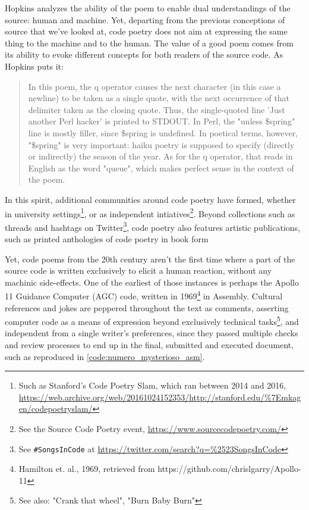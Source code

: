 Hopkins analyzes the ability of the poem to enable dual understandings of the source: human and machine. Yet, departing from the previous conceptions of source that we've looked at, code poetry does not aim at expressing the same thing to the machine and to the human. The value of a good poem comes from its ability to evoke different concepts for both readers of the source code. As Hopkins puts it:

\begin{quote}
  In this poem, the q operator causes the next character (in this case a newline) to be taken as a single quote, with
  the next occurrence of that delimiter taken as the closing quote. Thus, the single-quoted line 'Just another Perl
  hacker' is printed to STDOUT. In Perl, the "unless \$spring" line is mostly filler, since \$spring is undefined. In
  poetical terms, however, "\$spring" is very important: haiku poetry is supposed to specify (directly or indirectly) the
  season of the year. As for the q operator, that reads in English as the word "queue", which makes perfect sense in
  the context of the poem.  \cite{hopkins_camels_1992}
\end{quote}

In this spirit, additional communities around code poetry have formed, whether in university settings\footnote{Such as Stanford's Code Poetry Slam, which ran between 2014 and 2016, \url{https://web.archive.org/web/20161024152353/http://stanford.edu/\%7Emkagen/codepoetryslam/} }, or as independent intiatives\footnote{See the Source Code Poetry event, \url{https://www.sourcecodepoetry.com/}}. Beyond collections such as threads and hashtags on Twitter\footnote{See \lstinline{#SongsInCode} at \url{https://twitter.com/search?q=\%2523SongsInCode}}, code poetry also features artistic publications, such as printed anthologies of code poetry in book form\cite{bertram_code_2012}\cite{holden_code_2016}

Yet, code poems from the 20th century aren't the first time where a part of the source code is written exclusively to elicit a human reaction, without any machinic side-effects. One of the earliest of those instances is perhaps the Apollo 11 Guidance Computer (AGC) code, written in 1969\footnote{Hamilton et. al., 1969, retrieved from https://github.com/chrislgarry/Apollo-11} in Assembly. Cultural references and jokes are peppered throughout the text as comments, asserting computer code as a means of expression beyond exclusively technical tasks\footnote{See also: "Crank that wheel", "Burn Baby Burn"}, and independent from a single writer's preferences, since they passed multiple checks and review processes to end up in the final, submitted and executed document, such as reproduced in \ref{code:numero_mysterioso_asm}.

